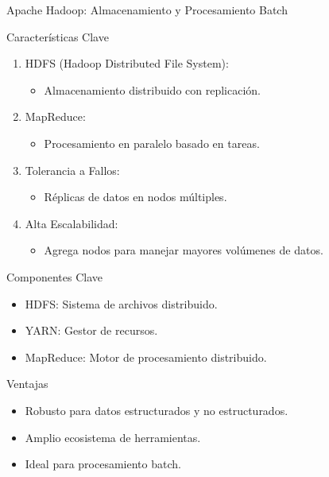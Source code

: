 \documentclass[presentation]{beamer}
\begin{document}
\begin{frame}[label={sec:org5e8c861}]{Apache Hadoop: Almacenamiento y Procesamiento Batch}
\begin{block}{Características Clave}
\begin{enumerate}
\item \alert{\alert{HDFS (Hadoop Distributed File System):}}
\begin{itemize}
\item Almacenamiento distribuido con replicación.
\end{itemize}
\item \alert{\alert{MapReduce:}}
\begin{itemize}
\item Procesamiento en paralelo basado en tareas.
\end{itemize}
\item \alert{\alert{Tolerancia a Fallos:}}
\begin{itemize}
\item Réplicas de datos en nodos múltiples.
\end{itemize}
\item \alert{\alert{Alta Escalabilidad:}}
\begin{itemize}
\item Agrega nodos para manejar mayores volúmenes de datos.
\end{itemize}
\end{enumerate}
\end{block}

\begin{block}{Componentes Clave}
\begin{itemize}
\item \alert{\alert{HDFS:}} Sistema de archivos distribuido.
\item \alert{\alert{YARN:}} Gestor de recursos.
\item \alert{\alert{MapReduce:}} Motor de procesamiento distribuido.
\end{itemize}
\end{block}

\begin{block}{Ventajas}
\begin{itemize}
\item Robusto para datos estructurados y no estructurados.
\item Amplio ecosistema de herramientas.
\item Ideal para procesamiento batch.
\end{itemize}
\end{block}


\end{frame}
\end{document}
